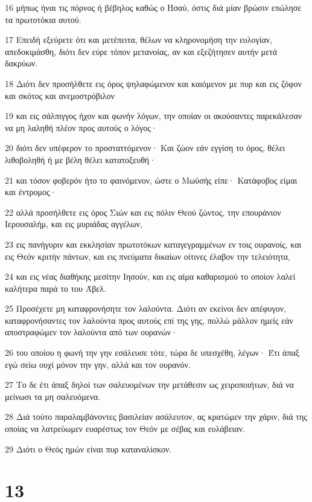 \par 16 μήπως ήναι τις πόρνος ή βέβηλος καθώς ο Ησαύ, όστις διά μίαν βρώσιν επώλησε τα πρωτοτόκια αυτού.
\par 17 Επειδή εξεύρετε ότι και μετέπειτα, θέλων να κληρονομήση την ευλογίαν, απεδοκιμάσθη, διότι δεν εύρε τόπον μετανοίας, αν και εξεζήτησεν αυτήν μετά δακρύων.
\par 18 Διότι δεν προσήλθετε εις όρος ψηλαφώμενον και καιόμενον με πυρ και εις ζόφον και σκότος και ανεμοστρόβιλον
\par 19 και εις σάλπιγγος ήχον και φωνήν λόγων, την οποίαν οι ακούσαντες παρεκάλεσαν να μη λαληθή πλέον προς αυτούς ο λόγος·
\par 20 διότι δεν υπέφερον το προσταττόμενον· Και ζώον εάν εγγίση το όρος, θέλει λιθοβοληθή ή με βέλη θέλει κατατοξευθή·
\par 21 και τόσον φοβερόν ήτο το φαινόμενον, ώστε ο Μωϋσής είπε· Κατάφοβος είμαι και έντρομος·
\par 22 αλλά προσήλθετε εις όρος Σιών και εις πόλιν Θεού ζώντος, την επουράνιον Ιερουσαλήμ, και εις μυριάδας αγγέλων,
\par 23 εις πανήγυριν και εκκλησίαν πρωτοτόκων καταγεγραμμένων εν τοις ουρανοίς, και εις Θεόν κριτήν πάντων, και εις πνεύματα δικαίων οίτινες έλαβον την τελειότητα,
\par 24 και εις νέας διαθήκης μεσίτην Ιησούν, και εις αίμα καθαρισμού το οποίον λαλεί καλήτερα παρά το του Άβελ.
\par 25 Προσέχετε μη καταφρονήσητε τον λαλούντα. Διότι αν εκείνοι δεν απέφυγον, καταφρονήσαντες τον λαλούντα προς αυτούς επί της γης, πολλώ μάλλον ημείς εάν αποστραφώμεν τον λαλούντα από των ουρανών·
\par 26 του οποίου η φωνή την γην εσάλευσε τότε, τώρα δε υπεσχέθη, λέγων· Έτι άπαξ εγώ σείω ουχί μόνον την γην, αλλά και τον ουρανόν.
\par 27 Το δε έτι άπαξ δηλοί των σαλευομένων την μετάθεσιν ως χειροποιήτων, διά να μείνωσι τα μη σαλευόμενα.
\par 28 Διά τούτο παραλαμβάνοντες βασιλείαν ασάλευτον, ας κρατώμεν την χάριν, διά της οποίας να λατρεύωμεν ευαρέστως τον Θεόν με σέβας και ευλάβειαν.
\par 29 Διότι ο Θεός ημών είναι πυρ καταναλίσκον.

\chapter{13}

